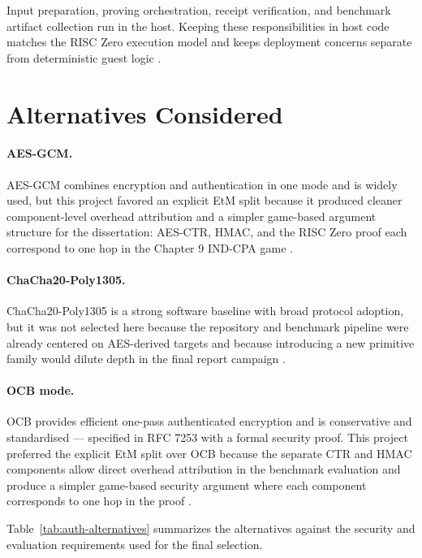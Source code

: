 Input preparation, proving orchestration, receipt verification, and benchmark
artifact collection run in the host. Keeping these responsibilities in host code
matches the RISC Zero execution model and keeps deployment concerns separate
from deterministic guest logic \cite{risczeroDocs}.

\section{Alternatives Considered}

\paragraph{AES-GCM.}
AES-GCM combines encryption and authentication in one mode and is widely used,
but this project favored an explicit EtM split because it produced cleaner
component-level overhead attribution and a simpler game-based argument structure
for the dissertation: AES-CTR, HMAC, and the RISC Zero proof each correspond to
one hop in the Chapter 9 IND-CPA game
\cite{nistsp80038d,bellare2000authenticated}.

\paragraph{ChaCha20-Poly1305.}
ChaCha20-Poly1305 is a strong software baseline with broad protocol adoption,
but it was not selected here because the repository and benchmark pipeline were
already centered on AES-derived targets and because introducing a new primitive
family would dilute depth in the final report campaign \cite{rfc8439}.

\paragraph{OCB mode.}
OCB provides efficient one-pass authenticated encryption and is conservative and
standardised --- specified in RFC 7253 with a formal security proof. This project
preferred the explicit EtM split over OCB because the separate CTR and HMAC
components allow direct overhead attribution in the benchmark evaluation and
produce a simpler game-based security argument where each component corresponds
to one hop in the proof \cite{rfc7253,rogaway2001ocb,bellare2000authenticated}.

Table~\ref{tab:auth-alternatives} summarizes the alternatives against the
security and evaluation requirements used for the final selection.

